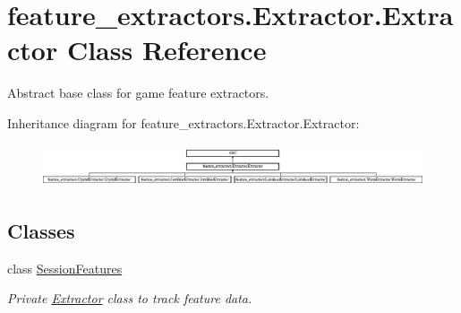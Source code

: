 \hypertarget{classfeature__extractors_1_1_extractor_1_1_extractor}{}\section{feature\+\_\+extractors.\+Extractor.\+Extractor Class Reference}
\label{classfeature__extractors_1_1_extractor_1_1_extractor}


Abstract base class for game feature extractors.  


Inheritance diagram for feature\+\_\+extractors.\+Extractor.\+Extractor\+:\begin{figure}[H]
\begin{center}
\leavevmode
\includegraphics[height=1.253731cm]{classfeature__extractors_1_1_extractor_1_1_extractor}
\end{center}
\end{figure}
\subsection*{Classes}
\begin{DoxyCompactItemize}
\item 
class \mbox{\hyperlink{classfeature__extractors_1_1_extractor_1_1_extractor_1_1_session_features}{Session\+Features}}
\begin{DoxyCompactList}\small\item\em Private \mbox{\hyperlink{classfeature__extractors_1_1_extractor_1_1_extractor}{Extractor}} class to track feature data. \end{DoxyCompactList}\end{DoxyCompactItemize}
